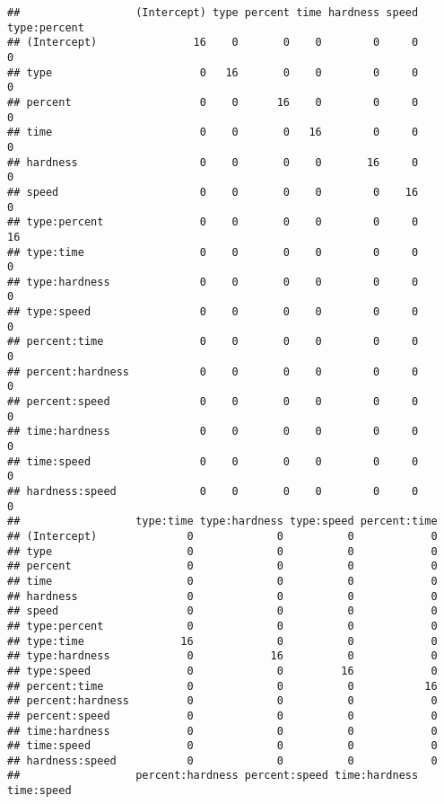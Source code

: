 \documentclass[
]{article}
\begin{document}
\begin{verbatim}
##                  (Intercept) type percent time hardness speed type:percent
## (Intercept)               16    0       0    0        0     0            0
## type                       0   16       0    0        0     0            0
## percent                    0    0      16    0        0     0            0
## time                       0    0       0   16        0     0            0
## hardness                   0    0       0    0       16     0            0
## speed                      0    0       0    0        0    16            0
## type:percent               0    0       0    0        0     0           16
## type:time                  0    0       0    0        0     0            0
## type:hardness              0    0       0    0        0     0            0
## type:speed                 0    0       0    0        0     0            0
## percent:time               0    0       0    0        0     0            0
## percent:hardness           0    0       0    0        0     0            0
## percent:speed              0    0       0    0        0     0            0
## time:hardness              0    0       0    0        0     0            0
## time:speed                 0    0       0    0        0     0            0
## hardness:speed             0    0       0    0        0     0            0
##                  type:time type:hardness type:speed percent:time
## (Intercept)              0             0          0            0
## type                     0             0          0            0
## percent                  0             0          0            0
## time                     0             0          0            0
## hardness                 0             0          0            0
## speed                    0             0          0            0
## type:percent             0             0          0            0
## type:time               16             0          0            0
## type:hardness            0            16          0            0
## type:speed               0             0         16            0
## percent:time             0             0          0           16
## percent:hardness         0             0          0            0
## percent:speed            0             0          0            0
## time:hardness            0             0          0            0
## time:speed               0             0          0            0
## hardness:speed           0             0          0            0
##                  percent:hardness percent:speed time:hardness time:speed

\end{verbatim}
\end{document}
